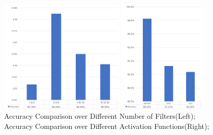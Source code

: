 \documentclass[a4paper, 11pt]{article} %
\begin{document}
\begin{figure}[H]
\begin{minipage}{0.6\linewidth}
\centerline{\includegraphics[width=6.0cm ]{figure/acc-channel}}
\end{minipage}
\hfill
\begin{minipage}{0.5\linewidth}
\centerline{\includegraphics[width=4.25cm]{figure/acc-activation}}
\end{minipage}
\caption{Accuracy Comparison over Different Number of Filters(Left); 
Accuracy Comparison over Different Activation Functions(Right);}
\label{fig_f0fit}
\end{figure}
\end{document}
